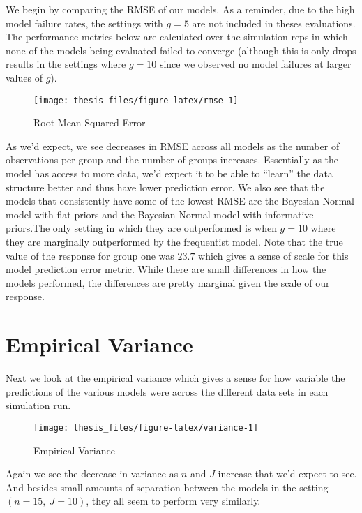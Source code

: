 \documentclass[12pt,twoside]{reedthesis}
\begin{document}
We begin by comparing the RMSE of our models. As a reminder, due to the high model failure rates, the settings with \(g = 5\) are not included in theses evaluations. The performance metrics below are calculated over the simulation reps in which none of the models being evaluated failed to converge (although this is only drops results in the settings where \(g = 10\) since we observed no model failures at larger values of \(g\)).
\begin{figure}

{\centering \texttt{[image: thesis\_files/figure-latex/rmse-1]} 

}

\caption{Root Mean Squared Error}\label{fig:rmse}
\end{figure}
As we'd expect, we see decreases in RMSE across all models as the number of observations per group and the number of groups increases. Essentially as the model has access to more data, we'd expect it to be able to ``learn'' the data structure better and thus have lower prediction error. We also see that the models that consistently have some of the lowest RMSE are the Bayesian Normal model with flat priors and the Bayesian Normal model with informative priors.The only setting in which they are outperformed is when \(g = 10\) where they are marginally outperformed by the frequentist model. Note that the true value of the response for group one was \(23.7\) which gives a sense of scale for this model prediction error metric. While there are small differences in how the models performed, the differences are pretty marginal given the scale of our response.

\hypertarget{empirical-variance}{%
\section{Empirical Variance}\label{empirical-variance}}

Next we look at the empirical variance which gives a sense for how variable the predictions of the various models were across the different data sets in each simulation run.
\begin{figure}

{\centering \texttt{[image: thesis\_files/figure-latex/variance-1]} 

}

\caption{Empirical Variance}\label{fig:variance}
\end{figure}
Again we see the decrease in variance as \(n\) and \(J\) increase that we'd expect to see. And besides small amounts of separation between the models in the setting \((n = 15, \ J = 10)\), they all seem to perform very similarly.
\end{document}

